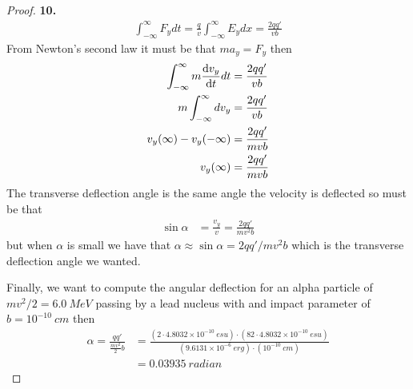 \documentclass[11pt]{article}
\theoremstyle{definition}
\begin{document}
\begin{proof}{\textbf{10.}}
\begin{align*}
        \int_{-\infty}^\infty F_y dt = \frac{q}{v}\int_{-\infty}^\infty E_y dx
        = \frac{2qq'}{vb}
    \end{align*}
    From Newton's second law it must be that $m a_y = F_y$ then
    \begin{align*}
        \int_{-\infty}^\infty m\derivative{v_y}{t} dt &= \frac{2qq'}{vb}\\
        m\int_{-\infty}^\infty dv_y &= \frac{2qq'}{vb}\\
        v_y(\infty) - v_y(-\infty) &= \frac{2qq'}{mvb}\\
        v_y(\infty) &= \frac{2qq'}{mvb}
    \end{align*}
    The transverse deflection angle is the same angle the velocity is deflected
    so must be that
    \begin{align*}
        \sin\alpha &= \frac{v_y}{v} = \frac{2qq'}{mv^2b}
    \end{align*}
    but when $\alpha$ is small we have that
    $\alpha \approx \sin\alpha = 2qq'/mv^2b$ which is the transverse deflection
    angle we wanted.

    Finally, we want to compute the angular deflection for an alpha particle of
    $mv^2/2 = 6.0~MeV$ passing by a lead nucleus with and impact parameter of
    $b = 10^{-10}~cm$ then
    \begin{align*}
        \alpha = \frac{qq'}{\frac{mv^2}{2}b}
        &= \frac{
            (2 \cdot 4.8032\times 10^{-10}~esu)
            \cdot (82 \cdot 4.8032\times 10^{-10}~esu)
        }{(9.6131\times 10^{-6}~erg) \cdot (10^{-10}~cm)}\\
        &= 0.03935~radian
    \end{align*}
\end{proof}
\cleardoublepage
\end{document}
